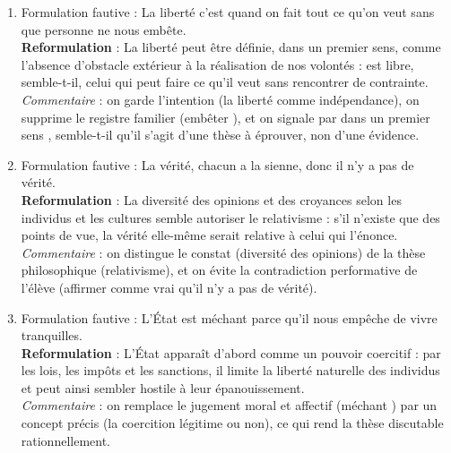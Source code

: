 \documentclass[11pt]{article}
\begin{document}
\begin{corrige}
\begin{enumerate}
\item Formulation fautive : \guillemotleft La liberté c'est quand on fait tout ce qu'on veut sans que personne ne nous embête. \guillemotright\\
\textbf{Reformulation} : \guillemotleft La liberté peut être définie, dans un premier sens, comme l'absence d'obstacle extérieur à la réalisation de nos volontés : est libre, semble-t-il, celui qui peut faire ce qu'il veut sans rencontrer de contrainte. \guillemotright\\
\emph{Commentaire} : on garde l'intention (la liberté comme indépendance), on supprime le registre familier (\guillemotleft embêter \guillemotright), et on signale par \guillemotleft dans un premier sens \guillemotright, \guillemotleft semble-t-il \guillemotright qu'il s'agit d'une thèse à éprouver, non d'une évidence.
\item Formulation fautive : \guillemotleft La vérité, chacun a la sienne, donc il n'y a pas de vérité. \guillemotright\\
\textbf{Reformulation} : \guillemotleft La diversité des opinions et des croyances selon les individus et les cultures semble autoriser le relativisme : s'il n'existe que des points de vue, la vérité elle-même serait relative à celui qui l'énonce. \guillemotright\\
\emph{Commentaire} : on distingue le constat (diversité des opinions) de la thèse philosophique (relativisme), et on évite la contradiction performative de l'élève (affirmer comme vrai qu'il n'y a pas de vérité).
\item Formulation fautive : \guillemotleft L'État est méchant parce qu'il nous empêche de vivre tranquilles. \guillemotright\\
\textbf{Reformulation} : \guillemotleft L'État apparaît d'abord comme un pouvoir coercitif : par les lois, les impôts et les sanctions, il limite la liberté naturelle des individus et peut ainsi sembler hostile à leur épanouissement. \guillemotright\\
\emph{Commentaire} : on remplace le jugement moral et affectif (\guillemotleft méchant \guillemotright) par un concept précis (la coercition légitime ou non), ce qui rend la thèse discutable rationnellement.
\end{enumerate}
\end{corrige}
\end{document}
